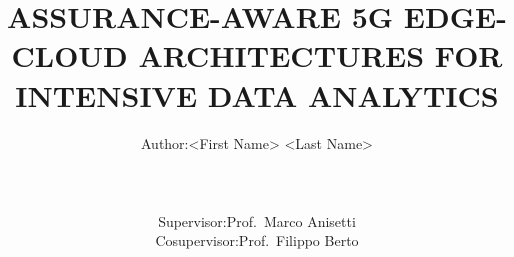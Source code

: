 \documentclass{scrbook}
\theoremstyle{definition}
\begin{document}
\subject{
	\uppercase{\huge Università degli Studi di Milano} \\
	\uppercase{\large Facoltà di scienze e tecnologie}
	\vspace{1em}\\
	\uppercase{\large Dipartimento di Informatica }\\
	\uppercase{\large ``Giovanni Degli Antoni''}
	\vspace{1em}\\
	\texttt{[image: images/unimi.pdf]}
	\vspace{1em}\\
	\uppercase{\large Laurea Magistrale in} \\
	\uppercase{\large Informatica} \\
}
\title{\LARGE\uppercase{Assurance-aware 5G Edge-Cloud Architectures for \\ Intensive data analytics}}
\author{
	\begin{tabular}{@{}r@{}rr@{}}
		\hspace{10em} & Author: & <First Name> <Last Name>
	\end{tabular}
	\\\\\vspace{1em}
	\begin{tabular}{@{}ll@{}r@{}}
		Supervisor:   & Prof.~Marco Anisetti & \hspace{10em} \\
		Cosupervisor: & Prof.~Filippo Berto  &               \\
	\end{tabular}
}
\date{}

\frontmatter
\maketitle





\tableofcontents
\listoffigures
\listoftables

\mainmatter{}
% 
% 
% 
% 
% 
% 
% 
% 
% 
% 
% 
% 
% 
% 


\appendix
% 

\backmatter{}
\printglossary[
	type=acronym,
	style=mcolindex,
	nonumberlist
]



\end{document}
